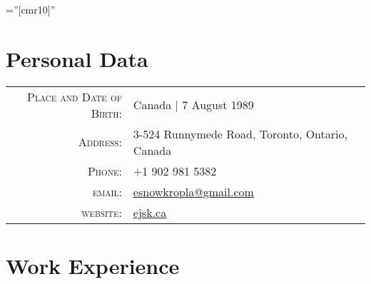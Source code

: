 \documentclass[a4paper,12pt]{article} %
\begin{document}
\pagestyle{empty} %

\font\fb=''[cmr10]'' %


\par{\bigskip\par} %

\section{Personal Data}

\begin{tabular}{rl}
\textsc{Place and Date of Birth:} & Canada  | 7 August 1989 \\
\textsc{Address:} & 3-524 Runnymede Road, Toronto, Ontario, Canada \\
\textsc{Phone:} & +1 902 981 5382\\
\textsc{email:} & \href{mailto:esnowkropla@gmail.com}{esnowkropla@gmail.com}\\
\textsc{website:} & \href{http://www.ejsk.ca}{ejsk.ca}\\
\end{tabular}


\section{Work Experience}
\end{document}
